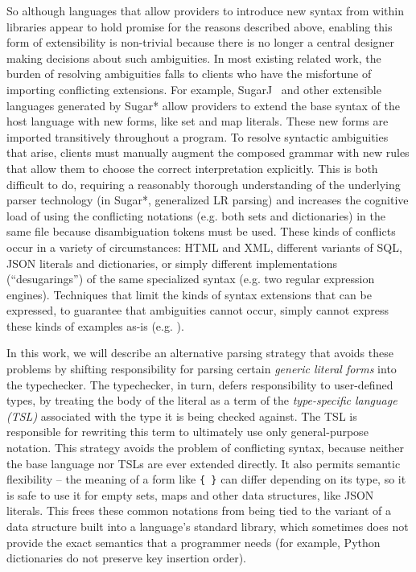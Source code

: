 So although languages that allow providers to introduce new syntax from within libraries appear to hold promise for the reasons described above, enabling this form of extensibility is non-trivial because there is no longer a central designer making decisions about such ambiguities. In most existing related work, the burden of resolving ambiguities falls to clients who have the misfortune of importing conflicting extensions. For example, SugarJ~\cite{Erdweg:2011:SLL:2048147.2048199} and other extensible languages generated by Sugar* \cite{Erdweg:2013:FEL:2517208.2517210} allow providers to extend the base syntax of the host language with new forms, like set and map literals. These new forms are imported transitively throughout a program. To resolve syntactic ambiguities that arise, clients must manually augment the composed grammar with new rules that allow them to choose the correct interpretation explicitly. This is both difficult to do, requiring a reasonably thorough understanding of the underlying parser technology (in Sugar*, generalized LR parsing) and increases the cognitive load of using the conflicting notations (e.g. both sets and dictionaries) in the same file because disambiguation tokens must be used. These kinds of conflicts occur in a variety of circumstances: HTML and XML, different variants of SQL, JSON literals and dictionaries, or simply different implementations (``desugarings'') of the same specialized syntax (e.g. two regular expression engines). Techniques that limit the kinds of syntax extensions that can be expressed, to guarantee that ambiguities cannot occur, simply cannot express these kinds of examples as-is (e.g. \cite{Schwerdfeger:2009:VCD:1542476.1542499}).

In this work, we will describe an alternative parsing strategy that avoids these problems by shifting responsibility for parsing certain \emph{generic literal forms} into the typechecker. The typechecker, in turn, defers responsibility to user-defined types, by treating the body of the literal as a term of the   \emph{type-specific language (TSL)} associated with the type it is being checked against. The TSL is responsible for rewriting this term to ultimately use only general-purpose notation. This strategy avoids the problem of conflicting syntax, because neither the base language nor TSLs are ever extended directly. It also permits semantic flexibility -- the meaning of a form like \verb|{ }| can differ depending  on its type, so it is safe to use it for empty sets, maps and other data structures, like JSON literals. This frees these common notations from being tied to the variant of a  data structure built into a language's standard library, which sometimes does not provide the exact semantics that a programmer needs (for example, Python dictionaries do not preserve key insertion order).

